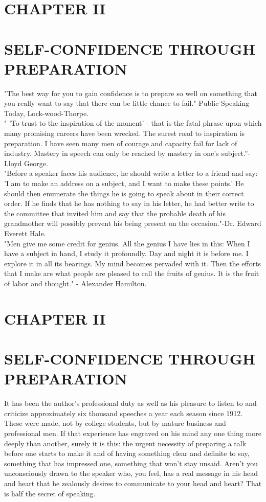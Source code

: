 \documentclass[10pt]{article}
\begin{document}
\section*{CHAPTER II}
\section*{SELF-CONFIDENCE THROUGH PREPARATION}
"The best way for you to gain confidence is to prepare so well on something that you really want to say that there can be little chance to fail."-Public Speaking Today, Lock-wood-Thorpe.\\
" 'To trust to the inspiration of the moment' - that is the fatal phrase upon which many promising careers have been wrecked. The surest road to inspiration is preparation. I have seen many men of courage and capacity fail for lack of industry. Mastery in speech can only be reached by mastery in one's subject.''-Lloyd George.\\
"Before a speaker faces his audience, he should write a letter to a friend and say: 'I am to make an address on a subject, and I want to make these points.' He should then enumerate the things he is going to speak about in their correct order. If he finds that he has nothing to say in his letter, he had better write to the committee that invited him and say that the probable death of his grandmother will possibly prevent his being present on the occasion."-Dr. Edward Everett Hale.\\
"Men give me some credit for genius. All the genius I have lies in this: When I have a subject in hand, I study it profoundly. Day and night it is before me. I explore it in all its bearings. My mind becomes pervaded with it. Then the efforts that I make are what people are pleased to call the fruits of genius. It is the fruit of labor and thought." - Alexander Hamilton.

\section*{CHAPTER II}
\section*{SELF-CONFIDENCE THROUGH PREPARATION}
It has been the author's professional duty as well as his pleasure to listen to and criticize approximately six thousand speeches a year each season since 1912. These were made, not by college students, but by mature business and professional men. If that experience has engraved on his mind any one thing more deeply than another, surely it is this: the urgent necessity of preparing a talk before one starts to make it and of having something clear and definite to say, something that has impressed one, something that won't stay unsaid. Aren't you unconsciously drawn to the speaker who, you feel, has a real message in his head and heart that he zealously desires to communicate to your head and heart? That is half the secret of speaking.
\end{document}
